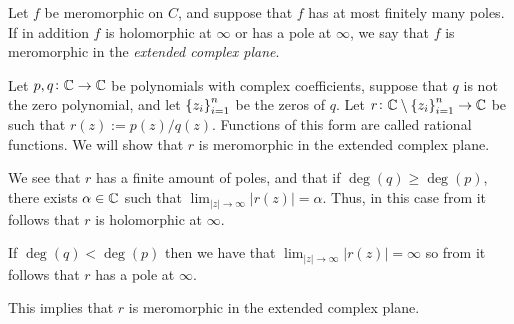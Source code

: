 \documentclass[11pt,a4paper]{article}
\begin{document}
\begin{definition}
  Let $f$ be meromorphic on $C$,
  and suppose that $f$ has at most finitely many poles.
  If in addition $f$ is holomorphic at $\infty$ or has a pole
  at $\infty$, we say that $f$ is meromorphic in the
  \textit{extended complex plane}.
\end{definition}

\begin{example}
  Let $p,q \colon \mathbb{C} \to \mathbb{C}$ be polynomials with complex coefficients,
  suppose that $q$ is not the zero polynomial,
  and let $\left\{z_i\right\}_{i=1}^{n}$ be the zeros of $q$.
  Let $r \colon \mathbb{C} \setminus \left\{z_i\right\}_{i=1}^{n} \to \mathbb{C}$ be such that
  $r(z) := p(z) / q(z)$.
  Functions of this form are called rational functions.
  We will show that $r$ is meromorphic in the extended complex plane.

  We see that $r$ has a finite amount of poles,
  and that if $\deg(q) \geq \deg(p)$, there exists $\alpha \in \mathbb{C}$
  such that $\lim_{|z| \to \infty} |r(z)| = \alpha$.
  Thus, in this case from 
  it follows that $r$ is holomorphic at $\infty$.

  If $\deg(q) < \deg(p)$ then we have that
  $\lim_{|z| \to \infty} |r(z)| = \infty$ so from 
  it follows that $r$ has a pole at $\infty$.
  
  This implies that $r$ is meromorphic in the extended complex plane.
\end{example}
\end{document}
